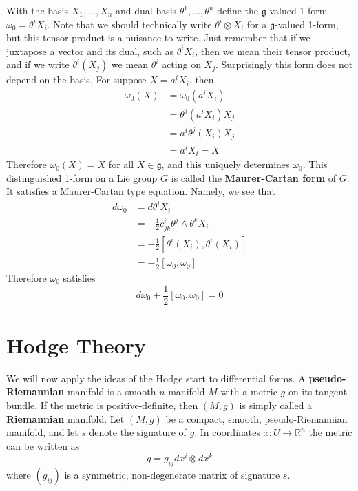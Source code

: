 With the basis $X_1,\ldots,X_n$ and dual basis $\theta^1,\ldots,\theta^n$ define the $\mathfrak g$-valued 1-form $\omega_0 = \theta^i X_i$. Note that we should technically write $\theta^i \otimes X_i$ for a $\mathfrak g$-valued 1-form, but this tensor product is a nuisance to write. Just remember that if we juxtapose a vector and its dual, such as $\theta^i X_i$, then we mean their tensor product, and if we write $\theta^i(X_j)$ we mean $\theta^i$ acting on $X_j$. Surprisingly this form does not depend on the basis. For suppose $X = a^i X_i$, then 
\begin{align*}
	\omega_0(X) &= \omega_0(a^i X_i) \\
	            &= \theta^j(a^i X_i) X_j \\
	            &= a^i \theta^j(X_i) X_j \\
	            &= a^i X_i = X
\end{align*}
Therefore $\omega_0(X)=X$ for all $X \in \mathfrak g$, and this uniquely determines $\omega_0$. This distinguished 1-form on a Lie group $G$ is called the \textbf{Maurer-Cartan form} of $G$. It satisfies a Maurer-Cartan type equation. Namely, we see that
\begin{align*}
	d\omega_0 &= d\theta^i X_i \\
	        &= -\frac{1}{2} c_{jk}^i \theta^j \wedge \theta^k X_i \\
	        &= -\frac{1}{2} [\theta^i (X_i),\theta^i (X_i)] \\
	        &= -\frac{1}{2} [\omega_0,\omega_0]
\end{align*}
Therefore $\omega_0$ satisfies
\begin{equation}
\label{Maurer-Cartan equation for the Maurer-Cartan form}
d\omega_0 + \frac{1}{2} [\omega_0,\omega_0] = 0
\end{equation}










\section{Hodge Theory}
\label{Hodge Theory}




We will now apply the ideas of the Hodge start to differential forms. A \textbf{pseudo-Riemannian} manifold is a smooth $n$-manifold $M$ with a metric $g$ on its tangent bundle. If the metric is positive-definite, then $(M,g)$ is simply called a \textbf{Riemannian} manifold. Let $(M,g)$ be a compact, smooth, pseudo-Riemannian manifold, and let $s$ denote the signature of $g$. In coordinates $x : U \rightarrow \mathbb R^n$ the metric can be written as
\[ g = g_{ij} dx^i \otimes dx^k \]
where $(g_{ij})$ is a symmetric, non-degenerate matrix of signature $s$. 

